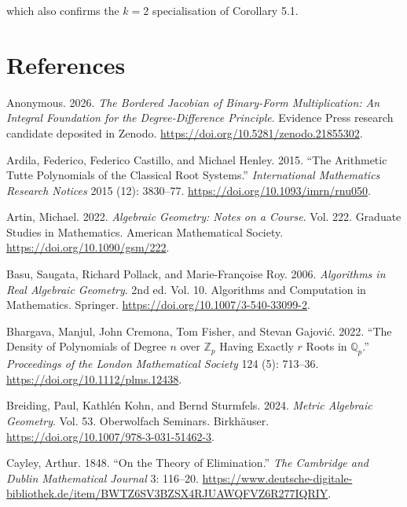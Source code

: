 \documentclass[
  11pt,
  a4paper,
]{article}
\newlength{\cslhangindent}
\newenvironment{CSLReferences}[2] %
 {\begin{list}{}{%
  \setlength{\itemindent}{0pt}
  \setlength{\leftmargin}{0pt}
  \setlength{\parsep}{0pt}
  \ifodd #1
   \setlength{\leftmargin}{\cslhangindent}
   \setlength{\itemindent}{-1\cslhangindent}
  \fi
  \setlength{\itemsep}{#2\baselineskip}}}
 {\end{list}}
\begin{document}
which also confirms the \(k=2\) specialisation of Corollary 5.1.

\section*{References}\label{references}

\protect{}\label{refs}
\begin{CSLReferences}{1}{1}
Anonymous. 2026. \emph{The Bordered Jacobian of Binary-Form
Multiplication: An Integral Foundation for the Degree-Difference
Principle}. Evidence Press research candidate deposited in Zenodo.
\url{https://doi.org/10.5281/zenodo.21855302}.

Ardila, Federico, Federico Castillo, and Michael Henley. 2015. {``The
Arithmetic {T}utte Polynomials of the Classical Root Systems.''}
\emph{International Mathematics Research Notices} 2015 (12): 3830--77.
\url{https://doi.org/10.1093/imrn/rnu050}.

Artin, Michael. 2022. \emph{Algebraic Geometry: Notes on a Course}. Vol.
222. Graduate Studies in Mathematics. American Mathematical Society.
\url{https://doi.org/10.1090/gsm/222}.

Basu, Saugata, Richard Pollack, and Marie-Françoise Roy. 2006.
\emph{Algorithms in Real Algebraic Geometry}. 2nd ed. Vol. 10.
Algorithms and Computation in Mathematics. Springer.
\url{https://doi.org/10.1007/3-540-33099-2}.

Bhargava, Manjul, John Cremona, Tom Fisher, and Stevan Gajović. 2022.
{``The Density of Polynomials of Degree {\(n\)} over {\(\mathbb Z_p\)}
Having Exactly {\(r\)} Roots in {\(\mathbb Q_p\)}.''} \emph{Proceedings
of the London Mathematical Society} 124 (5): 713--36.
\url{https://doi.org/10.1112/plms.12438}.

Breiding, Paul, Kathlén Kohn, and Bernd Sturmfels. 2024. \emph{Metric
Algebraic Geometry}. Vol. 53. Oberwolfach Seminars. Birkh{ä}user.
\url{https://doi.org/10.1007/978-3-031-51462-3}.

Cayley, Arthur. 1848. {``On the Theory of Elimination.''} \emph{The
Cambridge and Dublin Mathematical Journal} 3: 116--20.
\url{https://www.deutsche-digitale-bibliothek.de/item/BWTZ6SV3BZSX4RJUAWQFVZ6R277IQRIY}.


\end{CSLReferences}
\end{document}

